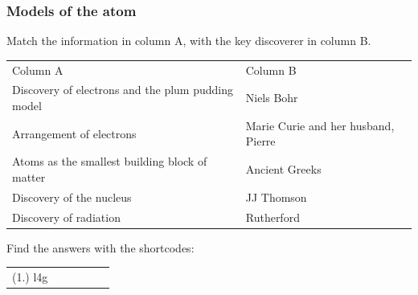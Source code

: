             \subsubsection{ Models of the atom}
            \nopagebreak
            \label{m38756*eip-786}Match the information in column A, with the key discoverer in column B.
          \begin{table}[H]
        \begin{center}
      \label{m38756*eip-551}
    \noindent
      \tablelasttail{}
      \begin{xtabular}[t]{|l|l|}\hline
        Column A &
        Column B%
     \tabularnewline{}
        Discovery of electrons and the plum pudding model &
        Niels Bohr%
     \tabularnewline{}
        Arrangement of electrons &
        Marie Curie and her husband, Pierre%
     \tabularnewline{}
        Atoms as the smallest building block of matter &
        Ancient Greeks%
     \tabularnewline{}
        Discovery of the nucleus &
        JJ Thomson%
     \tabularnewline{}
        Discovery of radiation &
        Rutherford%
     \tabularnewline{}
    \end{xtabular}
      \end{center}
\end{table}
    \par
        \par 
    \label{m38756*cid3}
\par {} Find the answers with the shortcodes:
 \par \begin{tabular}[h]{cccccc}
 (1.) l4g  & \end{tabular}
